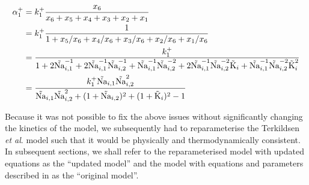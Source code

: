 \documentclass[11pt]{article}
\begin{document}
\begin{align}
	\alpha_1^+ &= k_1^+ \frac{x_6}{x_6 + x_5 + x_4 + x_3 + x_2 + x_1} \notag \\
	&= k_1^+ \frac{1}{1 + x_5/x_6 + x_4/x_6 + x_3/x_6 + x_2/x_6 + x_1/x_6} \notag  \\
	&= \frac{k_1^+}{1 + 2\tilde{\text{Na}}_{i,1}^{-1} + 2\tilde{\text{Na}}_{i,1}^{-1}\tilde{\text{Na}}_{i,2}^{-1} + \tilde{\text{Na}}_{i,1}^{-1}\tilde{\text{Na}}_{i,2}^{-2} + 2\tilde{\text{Na}}_{i,1}^{-1}\tilde{\text{Na}}_{i,2}^{-2}\tilde{\text{K}}_i + \tilde{\text{Na}}_{i,1}^{-1}\tilde{\text{Na}}_{i,2}^{-2}\tilde{\text{K}}_i^2} \notag  \\
	&= \frac{k_1^+  \tilde{\text{Na}}_{i,1}\tilde{\text{Na}}_{i,2}^2}{\tilde{\text{Na}}_{i,1}\tilde{\text{Na}}_{i,2}^2 + (1 + \tilde{\text{Na}}_{i,2})^2 + (1 + \tilde{\text{K}}_i)^2 -1}
\end{align}

Because it was not possible to fix the above issues without significantly changing the kinetics of the model, we subsequently had to reparameterise the Terkildsen \textit{et al}. model such that it would be physically and thermodynamically consistent. In subsequent sections, we shall refer to the reparameterised model with updated equations as the ``updated model'' and the model with equations and parameters described in \citep{terkildsen_balance_2007} as the ``original model''.
\end{document}
